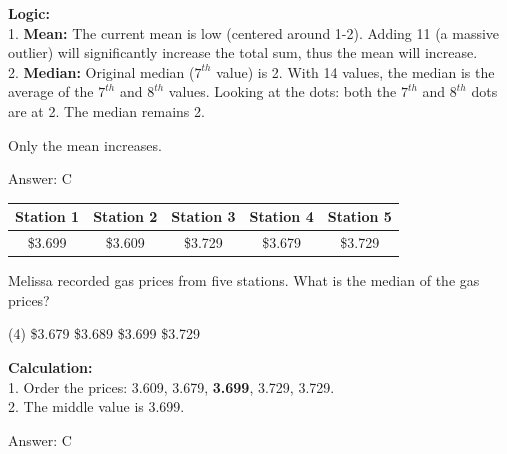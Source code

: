 \documentclass[11pt,paper=a4,answers]{exam}
\begin{document}
\begin{questions}
\begin{solution}
\textbf{Logic:} \\
1. \textbf{Mean:} The current mean is low (centered around 1-2). Adding 11 (a massive outlier) will significantly increase the total sum, thus the mean will increase. \\
2. \textbf{Median:} Original median ($7^{th}$ value) is 2. With 14 values, the median is the average of the $7^{th}$ and $8^{th}$ values. Looking at the dots: both the $7^{th}$ and $8^{th}$ dots are at 2. The median remains 2.

\vspace{20pt}

Only the mean increases.

\vspace{30pt}

Answer: \colorbox{yellow!100}{C}
\end{solution}

\vspace{60pt}

\question
\begin{center}
\begin{tabular}{|c|c|c|c|c|}
\hline
Station 1 & Station 2 & Station 3 & Station 4 & Station 5 \\ \hline
\$3.699 & \$3.609 & \$3.729 & \$3.679 & \$3.729 \\ \hline
\end{tabular}
\end{center}
Melissa recorded gas prices from five stations. What is the median of the gas prices?
\begin{tasks}(4)
    \task \$3.679
    \task \$3.689
    \task \$3.699
    \task \$3.729
\end{tasks}

\begin{solution}
\textbf{Calculation:} \\
1. Order the prices: 3.609, 3.679, \textbf{3.699}, 3.729, 3.729. \\
2. The middle value is 3.699.

\vspace{30pt}

Answer: \colorbox{yellow!100}{C}
\end{solution}

\vspace{60pt}


\end{questions}
\end{document}
